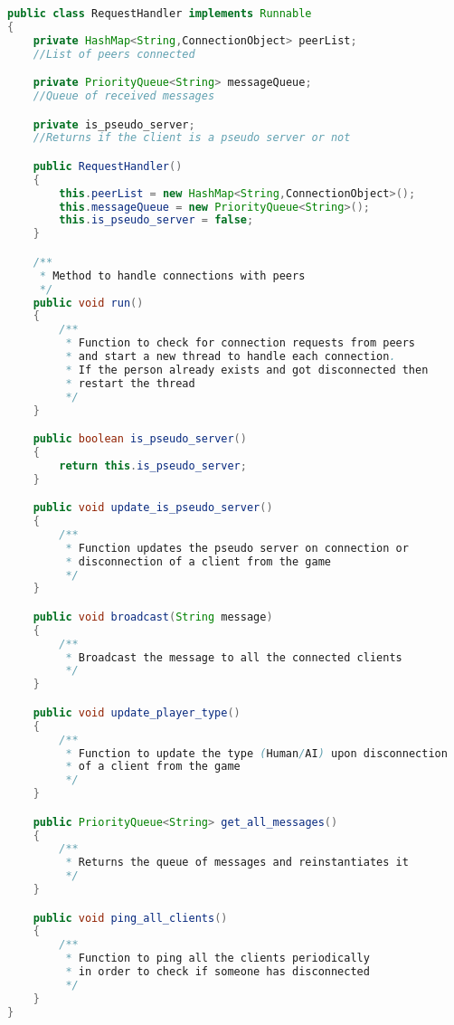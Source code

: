 \documentclass{article}
\begin{document}
\begin{lstlisting}[language=Java, caption={Class Parameters for Request Handler Class}]
public class RequestHandler implements Runnable
{
	private HashMap<String,ConnectionObject> peerList; 
	//List of peers connected

	private PriorityQueue<String> messageQueue; 
	//Queue of received messages

	private is_pseudo_server; 
	//Returns if the client is a pseudo server or not

	public RequestHandler()
	{
		this.peerList = new HashMap<String,ConnectionObject>();
		this.messageQueue = new PriorityQueue<String>();
		this.is_pseudo_server = false;
	} 

	/**
	 * Method to handle connections with peers
	 */
	public void run()
	{
		/**
		 * Function to check for connection requests from peers 
		 * and start a new thread to handle each connection.
		 * If the person already exists and got disconnected then
		 * restart the thread
		 */
	}

	public boolean is_pseudo_server()
	{
		return this.is_pseudo_server;
	}

	public void update_is_pseudo_server()
	{
		/**
		 * Function updates the pseudo server on connection or 
		 * disconnection of a client from the game
		 */
	}

	public void broadcast(String message)
	{
		/**
		 * Broadcast the message to all the connected clients
		 */
	}

	public void update_player_type()
	{
		/**
		 * Function to update the type (Human/AI) upon disconnection
		 * of a client from the game
		 */
	}

	public PriorityQueue<String> get_all_messages()
	{
		/**
		 * Returns the queue of messages and reinstantiates it
		 */
	}

	public void ping_all_clients()
	{
		/**
		 * Function to ping all the clients periodically
		 * in order to check if someone has disconnected
		 */
	}
}

\end{lstlisting}
\end{document}

